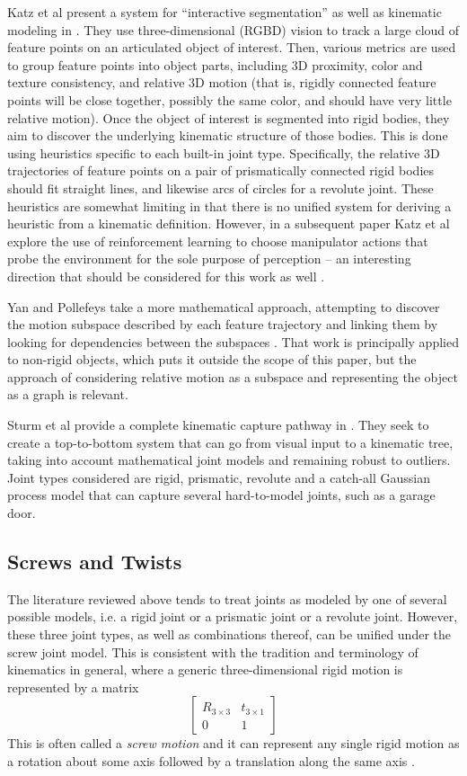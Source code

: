 \documentclass[letterpaper, 10 pt, conference]{ieeeconf}  %
\newcommand\mat[2]{\ensuremath{\left[\begin{array}{#1}#2\end{array}\right]}}
\begin{document}
Katz et al present a system for ``interactive segmentation'' as well as kinematic modeling in \cite{Katz2008}. They use three-dimensional (RGBD) vision to track a large cloud of feature points on an articulated object of interest. Then, various metrics are used to group feature points into object parts, including 3D proximity, color and texture consistency, and relative 3D motion (that is, rigidly connected feature points will be close together, possibly the same color, and should have very little relative motion). Once the object of interest is segmented into rigid bodies, they aim to discover the underlying kinematic structure of those bodies. This is done using heuristics specific to each built-in joint type. Specifically, the relative 3D trajectories of feature points on a pair of prismatically connected rigid bodies should fit straight lines, and likewise arcs of circles for a revolute joint. These heuristics are somewhat limiting in that there is no unified system for deriving a heuristic from a kinematic definition. However, in a subsequent paper Katz et al explore the use of reinforcement learning to choose manipulator actions that probe the environment for the sole purpose of perception -- an interesting direction that should be considered for this work as well \cite{Katz2008a}.

Yan and Pollefeys take a more mathematical approach, attempting to discover the motion subspace described by each feature trajectory and linking them by looking for dependencies between the subspaces \cite{Yan2006}. That work is principally applied to non-rigid objects, which puts it outside the scope of this paper, but the approach of considering relative motion as a subspace and representing the object as a graph is relevant.

Sturm et al provide a complete kinematic capture pathway in \cite{Sturm2011}. They seek to create a top-to-bottom system that can go from visual input to a kinematic tree, taking into account mathematical joint models and remaining robust to outliers. Joint types considered are rigid, prismatic, revolute and a catch-all Gaussian process model that can capture several hard-to-model joints, such as a garage door.

\subsection{Screws and Twists}
The literature reviewed above tends to treat joints as modeled by one of several possible models, i.e. a rigid joint or a prismatic joint or a revolute joint. However, these three joint types, as well as combinations thereof, can be unified under the screw joint model. This is consistent with the tradition and terminology of kinematics in general, where a generic three-dimensional rigid motion is represented by a matrix \[ \mat{c|c}{R_{3 \times 3} & t_{3 \times 1} \\\hline 0 & 1} \] This is often called a \emph{screw motion} and it can represent any single rigid motion as a rotation about some axis followed by a translation along the same axis \cite{Murray1994}.
\end{document}
